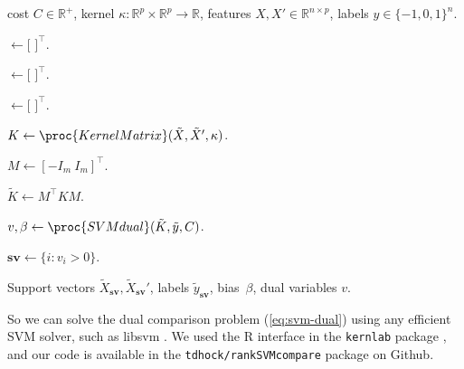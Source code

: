 \documentclass{article}
\newcommand{\SVMcompare}{SVMcompare}
\newcommand{\RR}{\mathbb R}
\begin{document}
\begin{algorithm}[b!]
   \caption{\SVMcompare}
   \label{alg:SVMcompare}
\begin{algorithmic}
   cost $C\in\RR^+$, kernel
  $\kappa:\RR^p\times \RR^p \rightarrow \RR$, features $X,X'\in\RR^{n \times p}$,
  labels $y\in\{-1,0,1\}^n$.

  \STATE {} $\gets [$
  $]^\intercal$.

  \STATE {} $\gets [$
  $]^\intercal$.

  \STATE {} $\gets [$
  $]^\intercal$.

  \STATE $K \gets \proc{KernelMatrix}(\tilde X, \tilde X', \kappa)$.

  \STATE $M \gets [ -I_m\ I_m ]^\intercal$.

  \STATE $\tilde K \gets M^\intercal K M$.

  \STATE $v,\beta \gets \proc{SVMdual}(\tilde K, \tilde y, C)$.



  \STATE $\textbf{sv}\gets\{i: v_i>0\}$.
  
   Support vectors $\tilde
  X_{\textbf{sv}},\tilde X_{\textbf{sv}}'$, labels $\tilde y_{\textbf{sv}}$,
  bias~$\beta$, dual variables $v$.

   \end{algorithmic}
\end{algorithm}

So we can solve the dual comparison problem (\ref{eq:svm-dual}) using
any efficient SVM solver, such as libsvm \citep{libsvm}. We used the R
interface in the \texttt{kernlab} package \citep{kernlab}, and our
code is available in the \texttt{tdhock/rankSVMcompare} package on Github.
\end{document}

